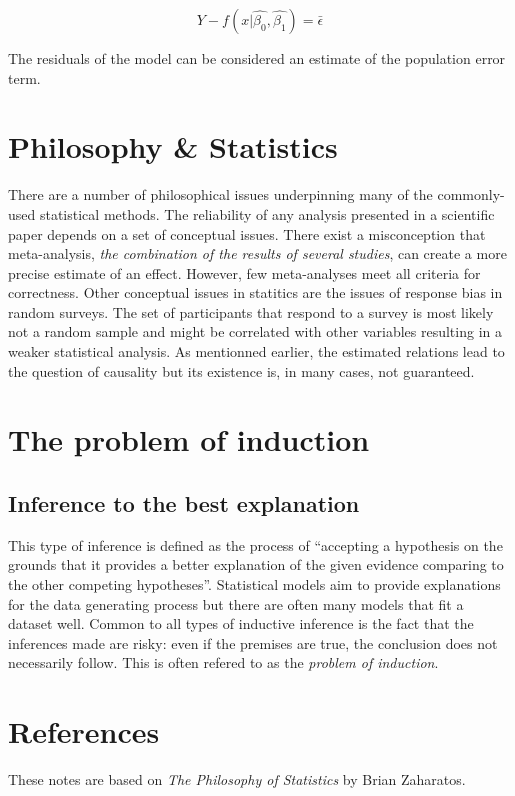 \documentclass{article}
\begin{document}
$$
    Y - f(x | \hat{\beta_{0}}, \hat{\beta_{1}}) = \bar{\epsilon}
$$

The residuals of the model can be considered an estimate of the population error term.

\section{Philosophy \& Statistics}

There are a number of philosophical issues underpinning many of the commonly-used
statistical methods. The reliability of any analysis presented in a scientific paper
depends on a set of conceptual issues. There exist a misconception that meta-analysis,
\textit{the combination of the results of several studies}, can create a more precise
estimate of an effect. However, few meta-analyses meet all criteria for correctness.
Other conceptual issues in statitics are the issues of response bias in random surveys.
The set of participants that respond to a survey is most likely not a random sample and
might be correlated with other variables resulting in a weaker statistical analysis. As
mentionned earlier, the estimated relations lead to the question of causality but its
existence is, in many cases, not guaranteed.

\section{The problem of induction}
\subsection{Inference to the best explanation}

This type of inference is defined as the  process of “accepting a hypothesis on the
grounds that it provides a better explanation of the given evidence comparing to
the other competing hypotheses”. Statistical models aim to provide explanations for
the data generating process but there are often many models that fit a dataset well.
Common to all types of inductive inference is the fact that the inferences made are
risky: even if the premises are true, the conclusion does not necessarily follow.
This is often refered to as the \textit{problem of induction}.




\section{References}

These notes are based on \textit{The Philosophy of Statistics} by Brian Zaharatos.
\end{document}
